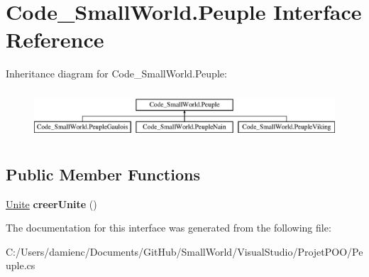 \hypertarget{interface_code___small_world_1_1_peuple}{\section{Code\-\_\-\-Small\-World.\-Peuple Interface Reference}
\label{interface_code___small_world_1_1_peuple}
}
Inheritance diagram for Code\-\_\-\-Small\-World.\-Peuple\-:\begin{figure}[H]
\begin{center}
\leavevmode
\includegraphics[height=1.821138cm]{interface_code___small_world_1_1_peuple}
\end{center}
\end{figure}
\subsection*{Public Member Functions}
\begin{DoxyCompactItemize}
\item 
\hypertarget{interface_code___small_world_1_1_peuple_adf261cd5244f9de0308f8257dedccbda}{\hyperlink{interface_code___small_world_1_1_unite}{Unite} {\bfseries creer\-Unite} ()}\label{interface_code___small_world_1_1_peuple_adf261cd5244f9de0308f8257dedccbda}

\end{DoxyCompactItemize}


The documentation for this interface was generated from the following file\-:\begin{DoxyCompactItemize}
\item 
C\-:/\-Users/damienc/\-Documents/\-Git\-Hub/\-Small\-World/\-Visual\-Studio/\-Projet\-P\-O\-O/Peuple.\-cs\end{DoxyCompactItemize}
